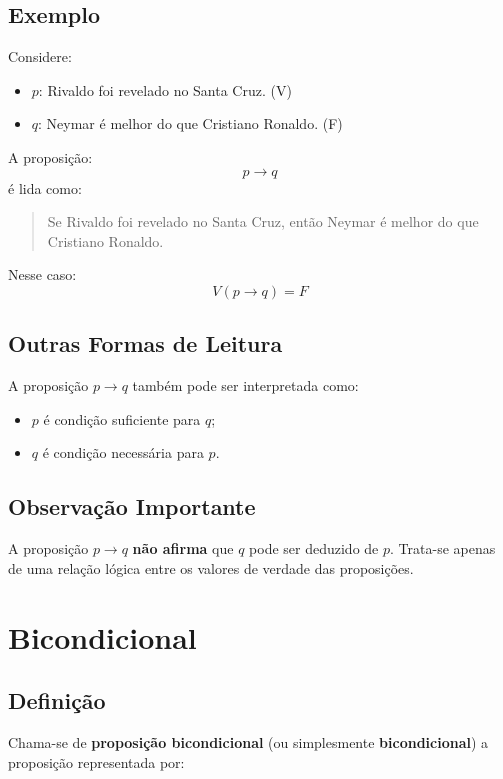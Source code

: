 \subsection{Exemplo}

Considere:
\begin{itemize}
    \item $p$: Rivaldo foi revelado no Santa Cruz. (V)
    \item $q$: Neymar é melhor do que Cristiano Ronaldo. (F)
\end{itemize}

A proposição:
\[
p \rightarrow q
\]
é lida como:

\begin{quote}
Se Rivaldo foi revelado no Santa Cruz, então Neymar é melhor do que Cristiano Ronaldo.
\end{quote}

Nesse caso:
\[
V(p \rightarrow q) = F
\]

\subsection{Outras Formas de Leitura}

A proposição $p \rightarrow q$ também pode ser interpretada como:
\begin{itemize}
    \item $p$ é condição suficiente para $q$;
    \item $q$ é condição necessária para $p$.
\end{itemize}

\subsection{Observação Importante}

A proposição $p \rightarrow q$ \textbf{não afirma} que $q$ pode ser deduzido de $p$. Trata-se apenas de uma relação lógica entre os valores de verdade das proposições.

\section{Bicondicional}

\subsection{Definição}

Chama-se de \textbf{proposição bicondicional} (ou simplesmente \textbf{bicondicional}) a proposição representada por:

